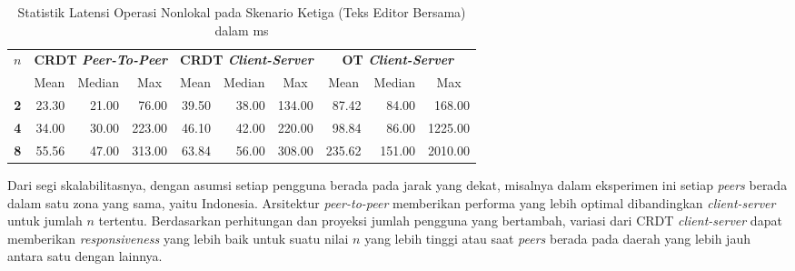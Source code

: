 \begin{table}[H]
 \centering

 \caption{Statistik Latensi Operasi Nonlokal pada Skenario Ketiga (Teks Editor Bersama) dalam ms}
 \label{tab:latency-3}
 \begin{tabular}{|c|rrr|rrr|rrr|}
\hline
\multirow{2}{*}{$n$} & \multicolumn{3}{c|}{\textbf{CRDT \textit{Peer-To-Peer}}} & \multicolumn{3}{c|}{\textbf{CRDT \textit{Client-Server}}} & \multicolumn{3}{c|}{\textbf{OT \textit{Client-Server}}} \\ \cline{2-10}
 & \multicolumn{1}{c|}{Mean} & \multicolumn{1}{c|}{Median} & \multicolumn{1}{c|}{Max} & \multicolumn{1}{c|}{Mean} & \multicolumn{1}{c|}{Median} & \multicolumn{1}{c|}{Max} & \multicolumn{1}{c|}{Mean} & \multicolumn{1}{c|}{Median} & \multicolumn{1}{c|}{Max} \\ \hline
\textbf{2} & \multicolumn{1}{r|}{23.30} & \multicolumn{1}{r|}{21.00} & 76.00 & \multicolumn{1}{r|}{39.50} & \multicolumn{1}{r|}{38.00} & 134.00 & \multicolumn{1}{r|}{87.42} & \multicolumn{1}{r|}{84.00} & 168.00 \\ \hline
\textbf{4} & \multicolumn{1}{r|}{34.00} & \multicolumn{1}{r|}{30.00} & 223.00 & \multicolumn{1}{r|}{46.10} & \multicolumn{1}{r|}{42.00} & 220.00 & \multicolumn{1}{r|}{98.84} & \multicolumn{1}{r|}{86.00} & 1225.00 \\ \hline
\textbf{8} & \multicolumn{1}{r|}{55.56} & \multicolumn{1}{r|}{47.00} & 313.00 & \multicolumn{1}{r|}{63.84} & \multicolumn{1}{r|}{56.00} & 308.00 & \multicolumn{1}{r|}{235.62} & \multicolumn{1}{r|}{151.00} & 2010.00 \\ \hline
\end{tabular}
\end{table}

Dari segi skalabilitasnya, dengan asumsi setiap pengguna berada pada jarak yang dekat, misalnya dalam eksperimen ini setiap \textit{peers} berada dalam satu zona yang sama, yaitu Indonesia. Arsitektur \textit{peer-to-peer} memberikan performa yang lebih optimal dibandingkan \textit{client-server} untuk jumlah $n$ tertentu. Berdasarkan perhitungan dan proyeksi jumlah pengguna yang bertambah, variasi dari CRDT \textit{client-server} dapat memberikan \textit{responsiveness} yang lebih baik untuk suatu nilai $n$ yang lebih tinggi atau saat \textit{peers} berada pada daerah yang lebih jauh antara satu dengan lainnya.

